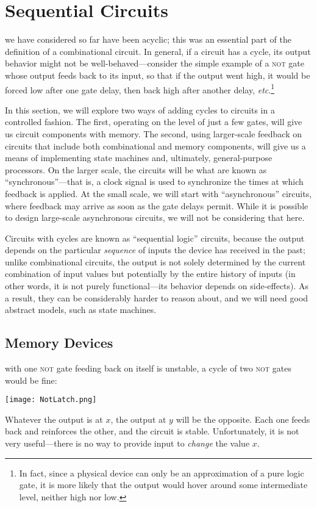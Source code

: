 
\section{Sequential Circuits}
 we have considered so far have been acyclic; this was an essential part of the definition of a combinational circuit. In general, if a circuit has a cycle, its output behavior might not be well-behaved---consider the simple example of a \textsc{not} gate whose output feeds back to its input, so that if the output went high, it would be forced low after one gate delay, then back high after another delay, \textit{etc}.\footnote{In fact, since a physical device can only be an approximation of a pure logic gate, it is more likely that the output would hover around some intermediate level, neither high nor low.}

In this section, we will explore two ways of adding cycles to circuits in a controlled fashion. The first, operating on the level of just a few gates, will give us circuit components with memory. The second, using larger-scale feedback on circuits that include both combinational and memory components, will give us a means of implementing state machines and, ultimately, general-purpose processors. On the larger scale, the circuits will be what are known as ``synchronous''---that is, a clock signal is used to synchronize the times at which feedback is applied. At the small scale, we will start with ``asynchronous'' circuits, where feedback may arrive as soon as the gate delays permit. While it is possible to design large-scale asynchronous circuits, we will not be considering that here.

Circuits with cycles are known as ``sequential logic'' circuits, because the output depends on the particular \emph{sequence} of inputs the device has received in the past; unlike combinational circuits, the output is not solely determined by the current combination of input values but potentially by the entire history of inputs (in other words, it is not purely functional---its behavior depends on side-effects). As a result, they can be considerably harder to reason about, and we will need good abstract models, such as state machines.

\subsection{Memory Devices}
 with one \textsc{not} gate feeding back on itself is unstable, a cycle of two \textsc{not} gates would be fine:
\begin{center}
\texttt{[image: NotLatch.png]}
\end{center}
Whatever the output is at $x$, the output at $y$ will be the opposite. Each one feeds back and reinforces the other, and the circuit is stable. Unfortunately, it is not very useful---there is no way to provide input to \emph{change} the value $x$.

